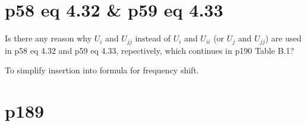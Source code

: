 \documentclass{exam}
\begin{document}
\section{p58 eq 4.32 \& p59 eq 4.33}
\begin{questions}

%
\question Is there any reason why $U_i$ and $U_{jj}$ instead of $U_i$ and $U_{ii}$ (or $U_j$ and $U_{jj}$) are used in p58 eq 4.32 and p59 eq 4.33, repectively, which continues in p190 Table B.1?

\begin{solution}
To simplify insertion into formula for frequency shift.
\end{solution}
\end{questions}

\section{p189}
\end{document}
